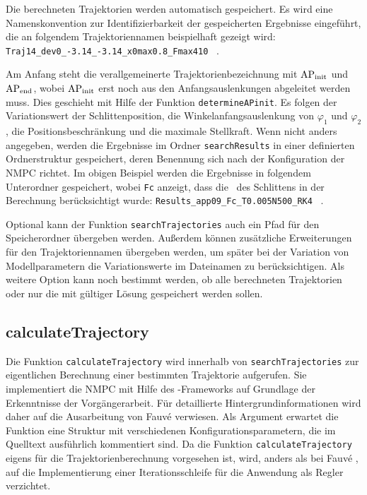 Die berechneten Trajektorien werden automatisch gespeichert. Es wird eine Namenskonvention zur Identifizierbarkeit der gespeicherten Ergebnisse eingeführt, die an folgendem Trajektoriennamen beispielhaft gezeigt wird: \texttt{Traj14\_dev0\_-3.14\_-3.14\_x0max0.8\_Fmax410} \ .

Am Anfang steht die verallgemeinerte Trajektorienbezeichnung mit $\mathrm{AP_{init}}$ und $\mathrm{AP_{end}}$, wobei $\mathrm{AP_{init}}$ erst noch aus den Anfangsauslenkungen abgeleitet werden muss. Dies geschieht mit Hilfe der Funktion \texttt{determineAPinit}. Es folgen der Variationswert der Schlittenposition, die Winkelanfangsauslenkung von $\varphi_1$ und $\varphi_2$, die Positionsbeschränkung und die maximale Stellkraft. 
Wenn nicht anders angegeben, werden die Ergebnisse im Ordner \texttt{searchResults} in einer definierten Ordnerstruktur gespeichert, deren Benennung sich nach der Konfiguration der NMPC richtet. Im obigen Beispiel werden die Ergebnisse in folgendem Unterordner gespeichert, wobei \texttt{Fc} anzeigt, dass die \crb\ des Schlittens in der Berechnung berücksichtigt wurde: \texttt{Results\_app09\_Fc\_T0.005N500\_RK4} \ .

Optional kann der Funktion \texttt{searchTrajectories} auch ein Pfad für den Speicherordner übergeben werden. Außerdem können zusätzliche Erweiterungen für den Trajektoriennamen übergeben werden, um später bei der Variation von Modellparametern die Variationswerte im Dateinamen zu berücksichtigen. 
Als weitere Option kann noch bestimmt werden, ob alle berechneten Trajektorien oder nur die mit gültiger Lösung gespeichert werden sollen. 







\subsection{calculateTrajectory}\label{subsec:calctrj}

Die Funktion \texttt{calculateTrajectory} wird innerhalb von \texttt{searchTrajectories} zur eigentlichen Berechnung einer bestimmten Trajektorie aufgerufen. Sie implementiert die NMPC mit Hilfe des \casadi-Frameworks auf Grundlage der Erkenntnisse der Vorgängerarbeit. Für detaillierte Hintergrundinformationen wird daher auf die Ausarbeitung von Fauvé \cite{fauve} verwiesen. Als Argument erwartet die Funktion eine Struktur mit verschiedenen Konfigurationsparametern, die im Quelltext ausführlich kommentiert sind. Da die Funktion \texttt{calculateTrajectory} eigens für die Trajektorienberechnung vorgesehen ist, wird, anders als bei Fauvé \cite{fauve}, auf die Implementierung einer Iterationsschleife für die Anwendung als Regler verzichtet.

